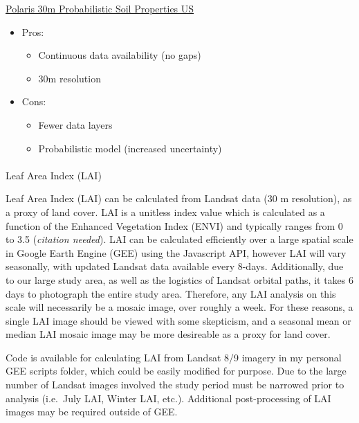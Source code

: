 \documentclass[
]{agujournal2019}
\makeatletter
\let\oldparagraph\paragraph
\renewcommand{\paragraph}{
    \@ifstar
      \xxxParagraphStar
      \xxxParagraphNoStar
  }
\newcommand{\xxxParagraphStar}[1]{\oldparagraph*{#1}\mbox{}}
\newcommand{\xxxParagraphNoStar}[1]{\oldparagraph{#1}\mbox{}}
\providecommand{\tightlist}{%
  \setlength{\itemsep}{0pt}\setlength{\parskip}{0pt}}\usepackage{longtable,booktabs,array}
\makeatother
\begin{document}
\href{https://gee-community-catalog.org/projects/polaris/}{Polaris 30m
Probabilistic Soil Properties US}

\begin{itemize}
\tightlist
\item
  Pros:

  \begin{itemize}
  \tightlist
  \item
    Continuous data availability (no gaps)
  \item
    30m resolution
  \end{itemize}
\item
  Cons:

  \begin{itemize}
  \tightlist
  \item
    Fewer data layers
  \item
    Probabilistic model (increased uncertainty)
  \end{itemize}
\end{itemize}

\paragraph{Leaf Area Index (LAI)}\label{leaf-area-index-lai}

Leaf Area Index (LAI) can be calculated from Landsat data (30 m
resolution), as a proxy of land cover. LAI is a unitless index value
which is calculated as a function of the Enhanced Vegetation Index
(ENVI) and typically ranges from 0 to 3.5 (\emph{citation needed}). LAI
can be calculated efficiently over a large spatial scale in Google Earth
Engine (GEE) using the Javascript API, however LAI will vary seasonally,
with updated Landsat data available every 8-days. Additionally, due to
our large study area, as well as the logistics of Landsat orbital paths,
it takes 6 days to photograph the entire study area. Therefore, any LAI
analysis on this scale will necessarily be a mosaic image, over roughly
a week. For these reasons, a single LAI image should be viewed with some
skepticism, and a seasonal mean or median LAI mosaic image may be more
desireable as a proxy for land cover.

Code is available for calculating LAI from Landsat 8/9 imagery in my
personal GEE scripts folder, which could be easily modified for purpose.
Due to the large number of Landsat images involved the study period must
be narrowed prior to analysis (i.e.~July LAI, Winter LAI, etc.).
Additional post-processing of LAI images may be required outside of GEE.
\end{document}
